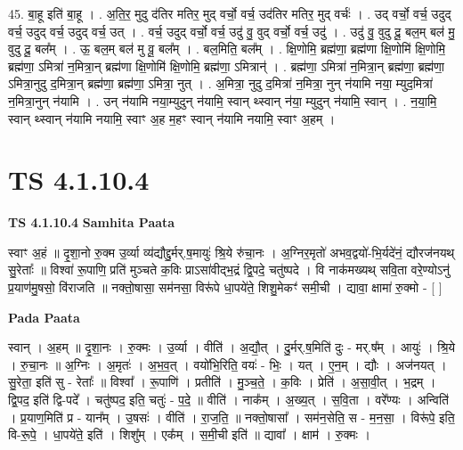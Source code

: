 \documentclass[17pt]{extarticle}
\begin{document}
45. बा॒हू इति॑ बा॒हू । . अ॒ति॒र॒ मुदु द॑तिर मतिर॒ मुद् वर्चो॒ वर्च॒ उद॑तिर मतिर॒ मुद् वर्चः॑ । . उद् वर्चो॒ वर्च॒ उदुद् वर्च॒ उदुद् वर्च॒ उदुद् वर्च॒ उत् । . वर्च॒ उदुद् वर्चो॒ वर्च॒ उदु॑ वु॒ वुद् वर्चो॒ वर्च॒ उदु॑ । . उदु॑ वु॒ वुदु दू॒ बल॒म् बल॑ मु॒ वुदु दू॒ बल᳚म् । . ऊ॒ बल॒म् बल॑ मु वू॒ बल᳚म् । . बल॒मिति॒ बल᳚म् । . क्षि॒णोमि॒ ब्रह्म॑णा॒ ब्रह्म॑णा क्षि॒णोमि॑ क्षि॒णोमि॒ ब्रह्म॑णा॒ ऽमित्रा॑ न॒मित्रा॒न् ब्रह्म॑णा क्षि॒णोमि॑ क्षि॒णोमि॒ ब्रह्म॑णा॒ ऽमित्रान्॑ । . ब्रह्म॑णा॒ ऽमित्रा॑ न॒मित्रा॒न् ब्रह्म॑णा॒ ब्रह्म॑णा॒ ऽमित्रा॒नुदु द॒मित्रा॒न् ब्रह्म॑णा॒ ब्रह्म॑णा॒ ऽमित्रा॒ नुत् । . अ॒मित्रा॒ नुदु द॒मित्रा॑ न॒मित्रा॒ नुन् न॑यामि नया॒ म्युद॒मित्रा॑ न॒मित्रा॒नुन् न॑यामि । . उन् न॑यामि नया॒म्युदुन् न॑यामि॒ स्वान् थ्स्वान् न॑या॒ म्युदुन् न॑यामि॒ स्वान् । . न॒या॒मि॒ स्वान् थ्स्वान् न॑यामि नयामि॒ स्वाꣳ अ॒ह म॒हꣳ स्वान् न॑यामि नयामि॒ स्वाꣳ अ॒हम् । \newline
\pagebreak
{}

\section{ TS 4.1.10.4 }

\textbf{TS 4.1.10.4 } \newline
\textbf{Samhita Paata} \newline

स्वाꣳ अ॒हं ॥ दृ॒शा॒नो रु॒क्म उ॒र्व्या व्य॑द्यौद्दु॒र्मर्.ष॒मायुः॑ श्रि॒ये रु॑चा॒नः । अ॒ग्निर॒मृतो॑ अभव॒द्वयो॑-भि॒र्यदे॑नं॒ द्यौरज॑नयथ् सु॒रेताः᳚ ॥ विश्वा॑ रू॒पाणि॒ प्रति॑ मुञ्चते क॒विः प्राऽसा॑वीद्भ॒द्रं द्वि॒पदे॒ चतु॑ष्पदे । वि नाक॑मख्यथ् सवि॒ता वरे॒ण्योऽनु॑ प्र॒याण॑मु॒षसो॒ वि॑राजति ॥ नक्तो॒षासा॒ सम॑नसा॒ विरू॑पे धा॒पये॑ते॒ शिशु॒मेकꣳ॑ समी॒ची । द्यावा॒ क्षामा॑ रु॒क्मो - [  ] \newline

\textbf{Pada Paata} \newline

स्वान् । अ॒हम् ॥ दृ॒शा॒नः । रु॒क्मः । उ॒र्व्या । वीति॑ । अ॒द्यौ॒त् । दु॒र्मर्.ष॒मिति॑ दुः - मर्.ष᳚म् । आयुः॑ । श्रि॒ये । रु॒चा॒नः ॥ अ॒ग्निः । अ॒मृतः॑ । अ॒भ॒व॒त् । वयो॑भि॒रिति॒ वयः॑ - भिः॒ । यत् । ए॒न॒म् । द्यौः । अज॑नयत् । सु॒रेता॒ इति॑ सु - रेताः᳚ ॥ विश्वा᳚ । रू॒पाणि॑ । प्रतीति॑ । मु॒ञ्च॒ते॒ । क॒विः । प्रेति॑ । अ॒सा॒वी॒त् । भ॒द्रम् । द्वि॒पद॒ इति॑ द्वि-पदे᳚ । चतु॑ष्पद॒ इति॒ चतुः॑ - प॒दे॒ ॥ वीति॑ । नाक᳚म् । अ॒ख्य॒त् । स॒वि॒ता । वरे᳚ण्यः । अन्विति॑ । प्र॒याण॒मिति॑ प्र - यान᳚म् । उ॒षसः॑ । वीति॑ । रा॒ज॒ति॒ ॥ नक्तो॒षासा᳚ । सम॑न॒सेति॒ स - म॒न॒सा॒ । विरू॑पे॒ इति॒ वि-रू॒पे॒ । धा॒पये॑ते॒ इति॑ । शिशु᳚म् । एक᳚म् । स॒मी॒ची इति॑ ॥ द्यावा᳚ । क्षाम॑ । रु॒क्मः ।  \newline
\end{document}
